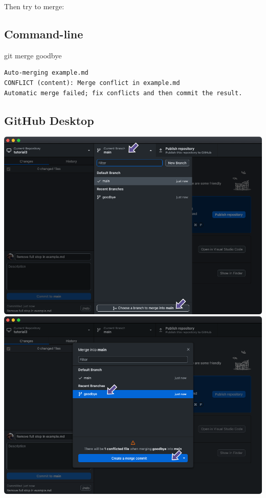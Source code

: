 \documentclass[
  letterpaper,
  DIV=11,
  numbers=noendperiod]{scrartcl}
\newenvironment{Shaded}{\begin{snugshade}}{\end{snugshade}}
\newcommand{\FunctionTok}[1]{\textcolor[rgb]{0.28,0.35,0.67}{#1}}
\newcommand{\NormalTok}[1]{\textcolor[rgb]{0.00,0.23,0.31}{#1}}
\begin{document}
Then try to merge:

\subsection{Command-line}

\begin{Shaded}
\begin{Highlighting}[]
\FunctionTok{git}\NormalTok{ merge goodbye}
\end{Highlighting}
\end{Shaded}

\begin{verbatim}
Auto-merging example.md
CONFLICT (content): Merge conflict in example.md
Automatic merge failed; fix conflicts and then commit the result.
\end{verbatim}

\subsection{GitHub Desktop}

\includegraphics{images/image62.png}
\includegraphics{images/image63.png}
\end{document}
